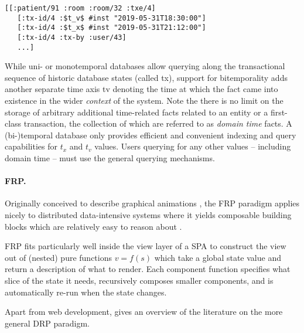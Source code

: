 \begin{lstlisting}[label={lst:examplefactstx},morekeywords={:tx-id/4},caption=Transaction metadata are first-class facts]
  [[:patient/91 :room :room/32 :txe/4]
   [:tx-id/4 :$t_v$ #inst "2019-05-31T18:30:00"]
   [:tx-id/4 :$t_x$ #inst "2019-05-31T21:12:00"]
   [:tx-id/4 :tx-by :user/43]
   ...]
  \end{lstlisting}

While uni- or monotemporal databases allow querying along the transactional sequence of historic database states (called \gls{tx}), support for bitemporality adds another separate time axis \gls{tv} denoting the time at which the fact came into existence in the wider \emph{context} of the system. Note the there is no limit on the storage of arbitrary additional time-related facts related to an entity or a first-class transaction, the collection of which are referred to as \emph{domain time} facts. A (bi-)temporal database only provides efficient and convenient indexing and query capabilities for $t_x$ and $t_v$ values. Users querying for any other values -- including domain time -- must use the general querying mechanisms.

\paragraph{\gls{FRP}.}
Originally conceived to describe graphical animations \cite{elliott1997functional}, the FRP paradigm applies nicely to distributed data-intensive systems where it yields composable building blocks which are relatively easy to reason about \cite{reynders2014multi}.

FRP fits particularly well inside the view layer of a \gls{SPA} to construct the view out of (nested) pure functions $v=f(s)$ which take a global state value and return a description of what to render. Each component function specifies what slice of the state it needs, recursively composes smaller components, and is automatically re-run when the state changes.

Apart from web development, \cite{salvaneschi2013towards} gives an overview of the literature on the more general \gls{DRP} paradigm.


\cleardoublepage
